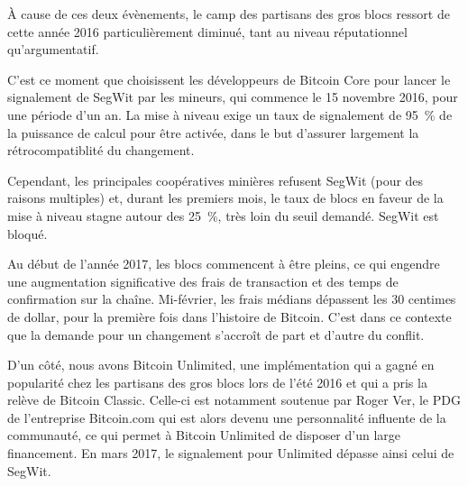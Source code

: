 À cause de ces deux évènements, le camp des partisans des gros blocs ressort de cette année 2016 particulièrement diminué, tant au niveau réputationnel qu'argumentatif.

C'est ce moment que choisissent les développeurs de Bitcoin Core pour lancer le signalement de SegWit par les mineurs, qui commence le 15 novembre 2016, pour une période d'un an. La mise à niveau exige un taux de signalement de 95~\% de la puissance de calcul pour être activée, dans le but d'assurer largement la rétrocompatiblité du changement.

Cependant, les principales coopératives minières refusent SegWit (pour des raisons multiples) et, durant les premiers mois, le taux de blocs en faveur de la mise à niveau stagne autour des 25~\%, très loin du seuil demandé. SegWit est bloqué.

Au début de l'année 2017, les blocs commencent à être pleins, ce qui engendre une augmentation significative des frais de transaction et des temps de confirmation sur la chaîne. Mi-février, les frais médians dépassent les 30 centimes de dollar, pour la première fois dans l'histoire de Bitcoin. C'est dans ce contexte que la demande pour un changement s'accroît de part et d'autre du conflit.

D'un côté, nous avons Bitcoin Unlimited, une implémentation qui a gagné en popularité chez les partisans des gros blocs lors de l'été 2016 et qui a pris la relève de Bitcoin Classic. Celle-ci est notamment soutenue par Roger Ver, le PDG de l'entreprise Bitcoin.com qui est alors devenu une personnalité influente de la communauté, ce qui permet à Bitcoin Unlimited de disposer d'un large financement. En mars 2017, le signalement pour Unlimited dépasse ainsi celui de SegWit.

